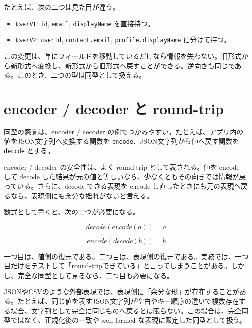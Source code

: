 たとえば、次の二つは見た目が違う。

\begin{itemize}
\item \texttt{UserV1}: \texttt{id}, \texttt{email}, \texttt{displayName} を直接持つ。
\item \texttt{UserV2}: \texttt{userId}, \texttt{contact.email}, \texttt{profile.displayName} に分けて持つ。
\end{itemize}

この変更は、単にフィールドを移動しているだけなら情報を失わない。旧形式から新形式へ変換し、新形式から旧形式へ戻すことができる。逆向きも同じである。このとき、二つの型は同型として扱える。

\section{encoder / decoder と round-trip}
\label{sec:ch06-round-trip}

同型の感覚は、encoder / decoder の例でつかみやすい。たとえば、アプリ内の値をJSON文字列へ変換する関数を \texttt{encode}、JSON文字列から値へ戻す関数を \texttt{decode} とする。

\begin{softwarebox}
encoder / decoder の安全性は、よく round-trip として表される。値を encode して decode した結果が元の値と等しいなら、少なくともその向きでは情報が戻っている。さらに、decode できる表現を encode し直したときにも元の表現へ戻るなら、表現側にも余分な揺れがないと言える。
\end{softwarebox}

数式として書くと、次の二つが必要になる。

\[
  \mathit{decode}(\mathit{encode}(a)) = a
\]

\[
  \mathit{encode}(\mathit{decode}(b)) = b
\]

一つ目は、値側の復元である。二つ目は、表現側の復元である。実務では、一つ目だけをテストして「round-tripできている」と言ってしまうことがある。しかし、完全な同型として見るなら、二つ目も必要になる。


\begin{warningbox}
JSONやCSVのような外部表現では、表現側に「余分な形」が存在することがある。たとえば、同じ値を表すJSON文字列が空白やキー順序の違いで複数存在する場合、文字列として完全に同じものへ戻るとは限らない。この場合は、完全同型ではなく、正規化後の一致や well-formed な表現に限定した同型として扱う。
\end{warningbox}


